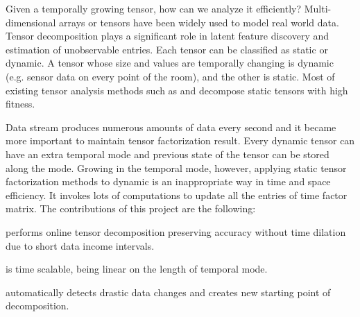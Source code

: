 
Given a temporally growing tensor, how can we analyze it efficiently? Multi-dimensional arrays or tensors have been widely used to model real world data. Tensor decomposition plays a significant role in latent feature discovery and estimation of unobservable entries. Each tensor can be classified as static or dynamic. A tensor whose size and values are temporally changing is dynamic (e.g. sensor data on every point of the room), and the other is static. Most of existing tensor analysis methods such as \cpals and \hosvd decompose static tensors with high fitness.

Data stream produces numerous amounts of data every second and it became more important to maintain tensor factorization result. Every dynamic tensor can have an extra temporal mode and previous state of the tensor can be stored along the mode. Growing in the temporal mode, however, applying static tensor factorization methods to dynamic is an inappropriate way in time and space efficiency. It invokes lots of computations to update all the entries of time factor matrix. The contributions of this project are the following:
\bit
\item \method performs online tensor decomposition preserving accuracy without time dilation due to short data income intervals.
\item \method is time scalable, being linear on the length of temporal mode. 
\item \method automatically detects drastic data changes and creates new starting point of decomposition.
\eit